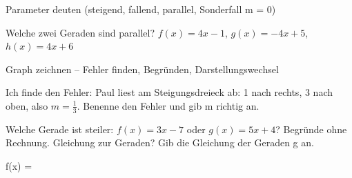 \begin{aufgabe}{Parameter deuten (steigend, fallend, parallel, Sonderfall m = 0)}
\begin{teile}
\teil Welche zwei Geraden sind parallel? $f(x) = 4x - 1$, $g(x) = -4x + 5$, $h(x) = 4x + 6$
\end{teile}
\end{aufgabe}

\begin{aufgabe}{Graph zeichnen – Fehler finden, Begründen, Darstellungswechsel}
\begin{teile}
\teil Ich finde den Fehler: Paul liest am Steigungsdreieck ab: 1 nach rechts, 3 nach oben, also $m = \frac{1}{3}$. Benenne den Fehler und gib m richtig an.

\begin{ksys}[xmin=-4,xmax=4,ymin=-5,ymax=5,ablesen]   \end{ksys}
\teil Welche Gerade ist steiler: $f(x) = 3x - 7$ oder $g(x) = 5x + 4$? Begründe ohne Rechnung.
\teil Gleichung zur Geraden? Gib die Gleichung der Geraden g an.

\begin{ksys}[xmin=-5,xmax=5,ymin=-5,ymax=5,ablesen]  \end{ksys}
f(x) = \leerfeld
\end{teile}
\end{aufgabe}
